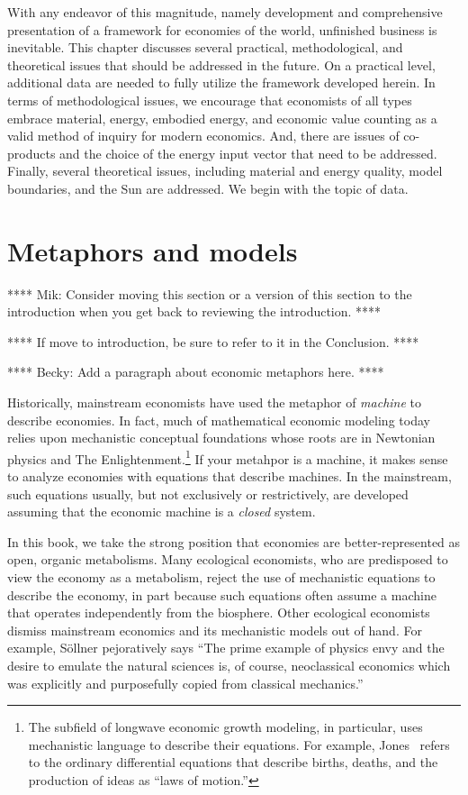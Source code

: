 With any endeavor of this magnitude, 
namely development and comprehensive presentation 
of a framework for economies of the world,
unfinished business is inevitable. 
This chapter discusses several 
practical, methodological, and theoretical issues
that should be addressed in the future.
On a practical level, additional data are needed 
to fully utilize the framework developed herein.
In terms of methodological issues, we encourage that economists of all types
embrace material, energy, embodied energy, and economic value counting 
as a valid method of inquiry for modern economics.
And, there are issues of co-products and the choice of the energy input vector
that need to be addressed.  
Finally, several theoretical issues, including
material and energy quality, 
model boundaries, and 
the Sun
are addressed.
We begin with the topic of data.


\section{Metaphors and models}
\label{sec:metaphors_and_models}

**** Mik: Consider moving this section or a version of this section 
to the introduction when you get back to reviewing the introduction. ****

**** If move to introduction, be sure to refer to it in the Conclusion. ****

**** Becky: Add a paragraph about economic metaphors here. ****

Historically, mainstream economists have used the metaphor of \emph{machine}
to describe economies. 
In fact, much of mathematical economic modeling today 
relies upon mechanistic conceptual foundations whose roots 
are in Newtonian physics 
and The Enlightenment.\footnote{The subfield 
of longwave economic growth modeling, in particular, 
uses mechanistic language to describe their equations. 
For example, Jones~\cite[pp. 6 \& 18]{Jones:2001wn} 
refers to the ordinary differential equations 
that describe births, deaths, and the production of ideas
as ``laws of motion.''}
If your metahpor is a machine, it makes sense to analyze economies
with equations that describe machines.
In the mainstream, such equations usually, but not exclusively or restrictively,
are developed assuming that the economic machine is a \emph{closed} system.

In this book, we take the strong position that economies are
better-represented as open, organic metabolisms.
Many ecological economists, 
who are predisposed to view the economy as a metabolism,
reject the use of mechanistic equations 
to describe the economy, in part because such equations often assume a 
machine that operates independently from the biosphere.
Other ecological economists dismiss mainstream economics 
and its mechanistic models out of hand. 
For example, S{\"o}llner pejoratively says 
``The prime example of physics envy and the desire 
to emulate the natural sciences is, of course, 
neoclassical economics which was explicitly and purposefully 
copied from classical mechanics.''~\cite[p. 178]{Sollner:1997wx}

